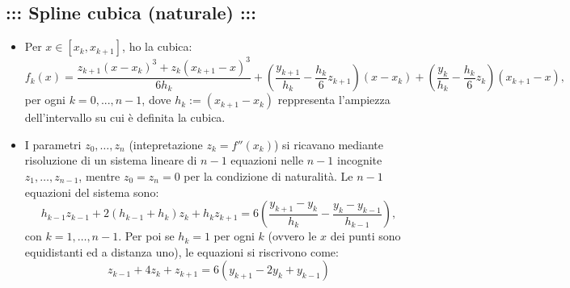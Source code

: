 \documentclass[a4paper,12pt]{amsart}
\begin{document}
\subsection*{\bf ::: Spline cubica (naturale) :::} 
\begin{itemize}
\item Per $x\in[x_k,x_{k+1}]$, ho la cubica:
$$f_k(x)=\frac{z_{k+1}(x-x_k)^3+z_k(x_{k+1}-x)^3}{6h_k}+\left(\frac{y_{k+1}}{h_k}-\frac{h_k}{6}z_{k+1}\right)(x-x_k)+\left(\frac{y_{k}}{h_k}-\frac{h_k}{6}z_{k}\right)(x_{k+1}-x),$$
per ogni $k=0,...,n-1$, dove $h_k:=(x_{k+1}-x_k)$ reppresenta l'ampiezza dell'intervallo su cui \`e definita la cubica.
\item I parametri $z_0,\ldots,z_n$ (intepretazione $z_k=f''(x_k)$) si ricavano mediante risoluzione di un sistema lineare di $n-1$ equazioni nelle $n-1$ incognite $z_1,\ldots,z_{n-1}$, mentre $z_0=z_n=0$ per la condizione di naturalit\`a. Le $n-1$ equazioni del sistema sono:
$$h_{k-1}z_{k-1}+2(h_{k-1}+h_k)z_k+h_kz_{k+1}=6\left(\frac{y_{k+1}-y_k}{h_k}-\frac{y_k-y_{k-1}}{h_{k-1}}\right),$$
con $k=1,\ldots,n-1$. Per poi se $h_k=1$ per ogni $k$ (ovvero le $x$ dei punti sono equidistanti ed a distanza uno), le equazioni si riscrivono come:
$$z_{k-1}+4 z_k+z_{k+1}=6 (y_{k+1}-2y_k+y_{k-1})$$
\end{itemize}

\newpage
\end{document}
